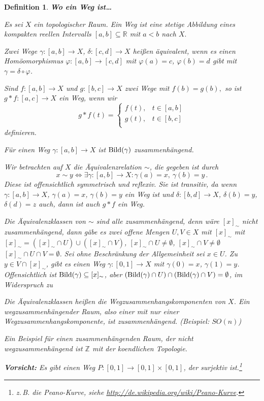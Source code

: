 \documentclass[12pt]{scrbook}   %
\newtheorem{definiX}[alles]{Definition}
\newenvironment{defini}[1]{\begin{definiX}{\bf #1}\par\rm}{\end{definiX}}
\begin{document}
\begin{defini} {Wo ein Weg ist\dots}
Es sei $X$ ein topologischer Raum. Ein {\it Weg} ist eine stetige 
Abbildung eines kompakten reellen Intervalls $[a,b]\subseteq \mathbb R$ mit $a<b$ nach $X.$

Zwei Wege $\gamma:[a,b]\to X$, $\delta:[c,d] \to X$ heißen äquivalent, wenn es einen Homöomorphismus $\varphi:[a,b]\to [c,d]$ mit $\varphi(a) = c$, $\varphi(b)=d$ gibt mit $\gamma = \delta\circ \varphi$.

Sind $f:[a,b]\longrightarrow X$ und $g:[b,c]\longrightarrow X$ zwei Wege mit
$f(b) = g(b),$ so ist $g\ast f: [a,c]\longrightarrow X$ ein Weg, wenn wir
\[g\ast f(t) = \left\{ \begin{array}{ll}f(t), & t\in [a,b]\\
                                   g(t), & t\in [b,c]\\
\end{array}\right.\]
definieren. 

Für einen Weg $\gamma:[a,b] \to X$ ist ${\rm Bild}(\gamma)$ zusammenhängend.

Wir betrachten auf $X$ die Äquivalenzrelation $\sim$, die gegeben ist durch 
\[ x\sim y \iff \exists \gamma : [a,b] \to X: \gamma(a) =x,\  \gamma(b)=y\,. \]
Diese ist offensichtlich symmetrisch und reflexiv. Sie ist transitiv, da  wenn $\gamma:[a,b] \to X$, $\gamma(a)=x$, $\gamma(b)=y$ ein Weg ist und $\delta:[b,d]\to X$, $\delta(b)=y$, $\delta(d)=z$ auch, dann ist auch $g \ast f$ ein Weg.

Die Äquivalenzklassen von $\sim$ sind alle zusammenhängend, denn wäre $[x]_\sim$ nicht zusammenhängend, dann gäbe es zwei offene Mengen $U,V\in X$ mit $[x]_\sim$ mit $[x]_\sim = ([x]_\sim \cap U) \cup ([x]_\sim \cap V)$, $[x]_\sim \cap U\ne \emptyset$, $[x]_\sim \cap V\ne \emptyset$ $[x]_\sim \cap U\cap V = \emptyset$. Sei ohne Beschränkung der Allgemeinheit sei $x\in U$. Zu $y\in V\cap [x]_\sim$, gibt es einen Weg $\gamma:[0,1]\to X$ mit $\gamma(0)=x$, $\gamma(1)=y$. Offensichtlich ist ${\rm Bild}(\gamma)\subseteq [x]_\sim$, aber $({\rm Bild}(\gamma) \cap U) \cap ({\rm Bild}(\gamma) \cap V) = \emptyset$, im Widerspruch zu


Die Äquivalenzklassen heißen die {\it Wegzusammenhangskomponenten} von $X$. Ein wegzusammenhängender Raum, also einer mit nur einer Wegzusammenhangskomponente, ist zusammenhängend. (Beispiel: $SO(n)$)

Ein Beispiel für einen zusammenhängenden Raum, der nicht wegzusammenhängend ist $\mathbb Z$ mit der koendlichen Topologie.

{\bf Vorsicht:} Es gibt einen Weg $P:[0,1] \to [0,1]\times [0,1]$, der surjektiv ist.\footnote{z.\,B. die Peano-Kurve, siehe \url{http://de.wikipedia.org/wiki/Peano-Kurve}.}
\end{defini}
\end{document}
